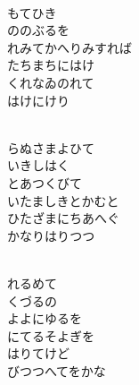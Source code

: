 \documentclass[10pt,b5j]{tarticle} %
\begin{document}
\begin{enumerate}
\begin{minipage}[c]{\blocksize}
        \vspace{\linespace}
        \item~\\
        もてひき\\
        ののぶるを\\
        れみてかへりみすれば\\
        たちまちにはけ\\
        くれなゐのれて\\
        はけにけり
        
    \end{minipage}
    \begin{minipage}[c]{\blocksize}
        
        \vspace{\linespace}
        \item~\\
        らぬさまよひて\\
        いきしはく\\
        とあつくびて\\
        いたましきとかむと\\
        ひたざまにちあへぐ\\
        かなりはりつつ
        
        \vspace{\linespace}
        \item~\\
        れるめて\\ %
        くづるの\\
        よよにゆるを\\
        にてるそよぎを\\
        はりてけど\\
        びつつへてをかな
    
    \end{minipage}
\end{enumerate} %
\end{document}

